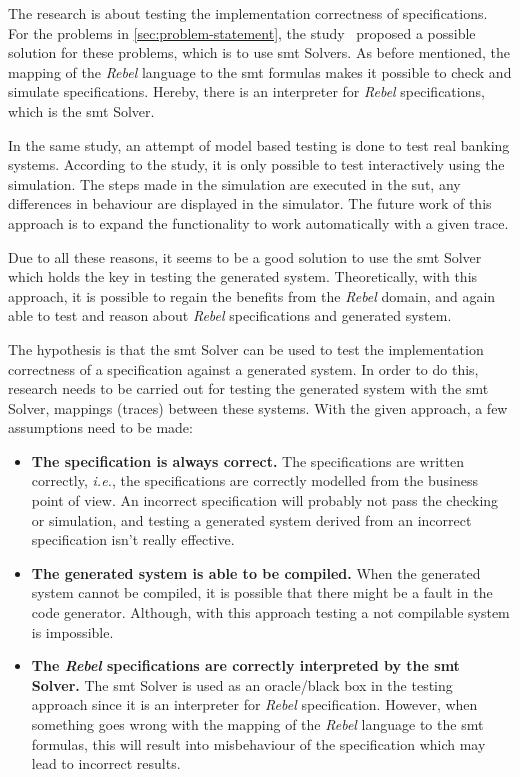The research is about testing the implementation correctness of specifications.
For the problems in \autoref{sec:problem-statement}, the
study~\cite[p.3]{stoelcase} proposed a possible solution for these problems,
which is to use \gls{smt} Solvers. As before mentioned, the mapping of the \textit{Rebel}
language to the \gls{smt} formulas makes it possible to check and simulate
specifications. Hereby, there is an interpreter for \textit{Rebel} specifications, which
is the \gls{smt} Solver.~\cite[p.5]{stoel_storm_vinju_bosman_2016}

In the same study,
an attempt of model based testing is done to test real banking systems.
According to the study, it is only possible to test interactively using the
simulation. The steps made in the simulation are executed in the \gls{sut}, any
differences in behaviour are displayed in the simulator. The future work of this
approach is to expand the functionality to work automatically with a given
trace.

Due to all these reasons, it seems to be a good solution to use the \gls{smt}
Solver which holds the key in testing the generated system. Theoretically, with
this approach, it is possible to regain the benefits from the \textit{Rebel} domain, and
again able to test and reason about \textit{Rebel} specifications and generated system.

The hypothesis is that the \gls{smt} Solver can be used to test the implementation
correctness of a specification against a generated system. In order to do this,
research needs to be carried out for testing the generated system
with the \gls{smt} Solver, mappings (traces) between these systems. With the given approach, a
few assumptions need to be made:

\begin{itemize}
\item \textbf{The specification is always correct.}
The specifications are written correctly, \textit{i.e.}, the specifications are
correctly modelled from the business point of view. An incorrect specification
will probably not pass the checking or simulation, and testing a generated
system derived from an incorrect specification isn't really effective.
\item \textbf{The generated system is able to be compiled.} When the generated
system cannot be compiled, it is possible that there might be a fault in the
code generator. Although, with this approach testing a not compilable system is
impossible.
\item \textbf{The \textit{Rebel} specifications are correctly interpreted by the \gls{smt}
Solver.} The \gls{smt} Solver is used as an oracle/black box in the testing approach
since it is an interpreter for \textit{Rebel} specification. However, when
something goes wrong with the mapping of the \textit{Rebel} language to the \gls{smt}
formulas, this will result into misbehaviour of the specification which may lead
to incorrect results.
\end{itemize}

